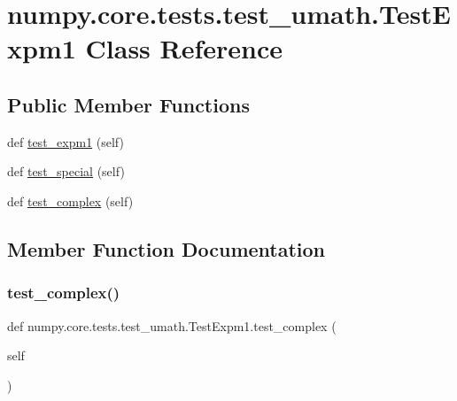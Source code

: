 \hypertarget{classnumpy_1_1core_1_1tests_1_1test__umath_1_1TestExpm1}{}\section{numpy.\+core.\+tests.\+test\+\_\+umath.\+Test\+Expm1 Class Reference}
\label{classnumpy_1_1core_1_1tests_1_1test__umath_1_1TestExpm1}
\subsection*{Public Member Functions}
\begin{DoxyCompactItemize}
\item 
def \hyperlink{classnumpy_1_1core_1_1tests_1_1test__umath_1_1TestExpm1_a221629f56b2049f7e3963da12f6aa9d2}{test\+\_\+expm1} (self)
\item 
def \hyperlink{classnumpy_1_1core_1_1tests_1_1test__umath_1_1TestExpm1_a7ce6f8b81eba55c216197a8b317f4f2a}{test\+\_\+special} (self)
\item 
def \hyperlink{classnumpy_1_1core_1_1tests_1_1test__umath_1_1TestExpm1_ac01cc376d9c9b0ae185b2cd42ae65275}{test\+\_\+complex} (self)
\end{DoxyCompactItemize}


\subsection{Member Function Documentation}
\mbox{\label{classnumpy_1_1core_1_1tests_1_1test__umath_1_1TestExpm1_ac01cc376d9c9b0ae185b2cd42ae65275}} 
\subsubsection{\texorpdfstring{test\+\_\+complex()}{test\_complex()}}
{\footnotesize\ttfamily def numpy.\+core.\+tests.\+test\+\_\+umath.\+Test\+Expm1.\+test\+\_\+complex (\begin{DoxyParamCaption}\item[{}]{self }\end{DoxyParamCaption})}


